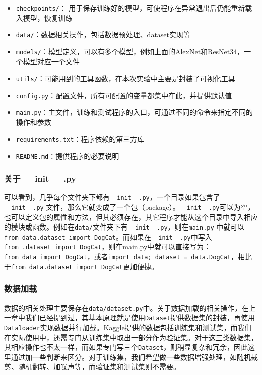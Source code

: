 \documentclass[11pt]{article}
\providecommand{\tightlist}{%
      \setlength{\itemsep}{0pt}\setlength{\parskip}{0pt}}
\begin{document}
\begin{itemize}
\tightlist
\item
  \texttt{checkpoints/}：
  用于保存训练好的模型，可使程序在异常退出后仍能重新载入模型，恢复训练
\item
  \texttt{data/}：数据相关操作，包括数据预处理、dataset实现等
\item
  \texttt{models/}：模型定义，可以有多个模型，例如上面的AlexNet和ResNet34，一个模型对应一个文件
\item
  \texttt{utils/}：可能用到的工具函数，在本次实验中主要是封装了可视化工具
\item
  \texttt{config.py}：配置文件，所有可配置的变量都集中在此，并提供默认值
\item
  \texttt{main.py}：主文件，训练和测试程序的入口，可通过不同的命令来指定不同的操作和参数
\item
  \texttt{requirements.txt}：程序依赖的第三方库
\item
  \texttt{README.md}：提供程序的必要说明
\end{itemize}

    \subsubsection{关于\_\_init\_\_.py}\label{ux5173ux4e8e__init__.py}

可以看到，几乎每个文件夹下都有\texttt{\_\_init\_\_.py}，一个目录如果包含了\texttt{\_\_init\_\_.py}
文件，那么它就变成了一个包（package）。\texttt{\_\_init\_\_.py}可以为空，也可以定义包的属性和方法，但其必须存在，其它程序才能从这个目录中导入相应的模块或函数。例如在\texttt{data/}文件夹下有\texttt{\_\_init\_\_.py}，则在\texttt{main.py}
中就可以\texttt{from\ data.dataset\ import\ DogCat}。而如果在\texttt{\_\_init\_\_.py}中写入\texttt{from\ .dataset\ import\ DogCat}，则在main.py中就可以直接写为：\texttt{from\ data\ import\ DogCat}，或者\texttt{import\ data;\ dataset\ =\ data.DogCat}，相比于\texttt{from\ data.dataset\ import\ DogCat}更加便捷。

    \subsubsection{数据加载}\label{ux6570ux636eux52a0ux8f7d}

数据的相关处理主要保存在\texttt{data/dataset.py}中。关于数据加载的相关操作，在上一章中我们已经提到过，其基本原理就是使用\texttt{Dataset}提供数据集的封装，再使用\texttt{Dataloader}实现数据并行加载。Kaggle提供的数据包括训练集和测试集，而我们在实际使用中，还需专门从训练集中取出一部分作为验证集。对于这三类数据集，其相应操作也不太一样，而如果专门写三个\texttt{Dataset}，则稍显复杂和冗余，因此这里通过加一些判断来区分。对于训练集，我们希望做一些数据增强处理，如随机裁剪、随机翻转、加噪声等，而验证集和测试集则不需要。
\end{document}
